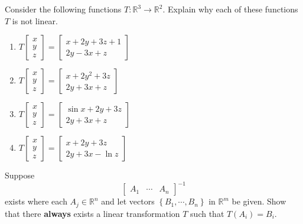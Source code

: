 \documentclass{ximera}
\begin{document}
\begin{problem}\label{prb:10.99} Consider the following functions $T:\mathbb{R}^{3}\rightarrow \mathbb{R}^{2}.$
Explain why each of these functions $T$ is not linear.

\begin{enumerate}
\item $T\left[
\begin{array}{c}
x \\
y \\
z
\end{array}
\right] =\left[
\begin{array}{c}
x+2y+3z+1 \\
2y-3x+z
\end{array}
\right] $

\item $T\left[
\begin{array}{c}
x \\
y \\
z
\end{array}
\right] =\left[
\begin{array}{c}
x+2y^{2}+3z \\
2y+3x+z
\end{array}
\right] $

\item $T\left[
\begin{array}{c}
x \\
y \\
z
\end{array}
\right] =\left[
\begin{array}{c}
\sin x+2y+3z \\
2y+3x+z
\end{array}
\right] $

\item $T\left[
\begin{array}{c}
x \\
y \\
z
\end{array}
\right] =\left[
\begin{array}{c}
x+2y+3z \\
2y+3x-\ln z
\end{array}
\right] $
\end{enumerate}
\end{problem}


\begin{problem}\label{prb:10.100} Suppose
\begin{equation*}
\left[
\begin{array}{ccc}
A_{1} & \cdots & A_{n}
\end{array}
\right] ^{-1}
\end{equation*}
 exists where each $A_{j}\in \mathbb{R}^{n}$ and let
vectors  $\left\{ B_{1},\cdots ,B_{n}\right\} $ in $\mathbb{R}^{m}$ be given.
Show that there \textbf{always }exists a linear
transformation $T$ such that $T(A_{i})=B_{i}$.
\end{problem}
\end{document}
